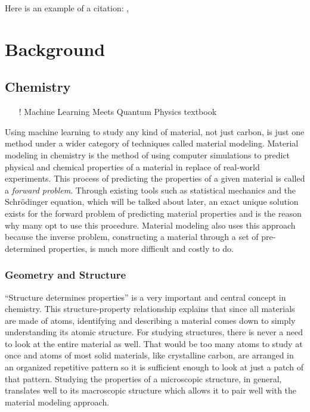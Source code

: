 \documentclass[12pt]{scrartcl}
\begin{document}
Here is an example of a citation: \cite{gap20}, \cite{DGL}

\newpage

\section{Background}

\subsection{Chemistry}
\begin{itemize}
    \item[!] Machine Learning Meets Quantum Physics textbook
\end{itemize}

Using machine learning to study any kind of material, not just carbon, 
is just one method under a wider category of techniques called material modeling. 
Material modeling in chemistry is the method of using computer simulations to predict 
physical and chemical properties of a material in replace of real-world experiments. 
This process of predicting the properties of a given material is called a \emph{forward 
problem}. Through existing tools such as statistical mechanics and the Schrödinger 
equation, which will be talked about later, an exact unique solution exists for the 
forward problem of predicting material properties and is the reason why many opt to 
use this procedure. Material modeling also uses this approach because the inverse 
problem, constructing a material through a set of pre-determined properties, 
is much more difficult and costly to do.

\subsubsection{Geometry and Structure}
``Structure determines properties'' is a very important and central concept in chemistry. 
This structure-property relationship explains that since all materials are made of atoms, identifying 
and describing a material comes down to simply understanding its atomic structure. For studying 
structures, there is never a need to look at the entire material as well. That would be too many 
atoms to study at once and atoms of most solid materials, like crystalline carbon, are arranged in 
an organized repetitive pattern so it is sufficient enough to look at just a patch of that pattern. 
Studying the properties of a microscopic structure, in general, translates well to its macroscopic 
structure which allows it to pair well with the material modeling approach.
\end{document}
